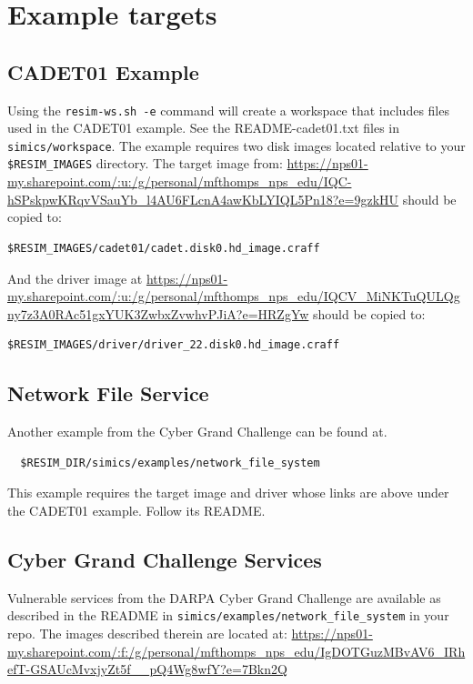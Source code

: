 \documentclass[titlepage]{article}
\begin{document}
\section{Example targets}
\label{example-targets}
\subsection{CADET01 Example}
Using the {\tt resim-ws.sh -e} command will create a workspace that includes files used in the CADET01 example.
See the README-cadet01.txt files in {\tt simics/workspace}.
The example requires two disk images located relative to your {\tt \$RESIM\_IMAGES} directory.  The target image from: 
\url{https://nps01-my.sharepoint.com/:u:/g/personal/mfthomps\_nps\_edu/IQC-hSPskpwKRqvVSauYb\_l4AU6FLcnA4awKbLYIQL5Pn18?e=9gzkHU}
\noindent should be copied to:
\begin{verbatim}
$RESIM_IMAGES/cadet01/cadet.disk0.hd_image.craff
\end{verbatim}
And the driver image at
   \url{https://nps01-my.sharepoint.com/:u:/g/personal/mfthomps\_nps\_edu/IQCV\_MiNKTuQULQgny7z3A0RAc51gxYUK3ZwbxZvwhvPJiA?e=HRZgYw}
\noindent should be copied to:
\begin{verbatim}
$RESIM_IMAGES/driver/driver_22.disk0.hd_image.craff
\end{verbatim}

\subsection{Network File Service}
Another example from the Cyber Grand Challenge can be found at.
\begin{verbatim}
  $RESIM_DIR/simics/examples/network_file_system
\end{verbatim}
This example requires the target image and driver whose links are above under the CADET01 example.
Follow its README.

\subsection{Cyber Grand Challenge Services}
Vulnerable services from the DARPA Cyber Grand Challenge are available as described in the
README in {\tt simics/examples/network\_file\_system} in your repo.
The images described therein are located at: 
\newline
\url{https://nps01-my.sharepoint.com/:f:/g/personal/mfthomps\_nps\_edu/IgDOTGuzMBvAV6\_IRhefT-GSAUcMvxjyZt5f\_\_pQ4Wg8wfY?e=7Bkn2Q}
\end{document}
